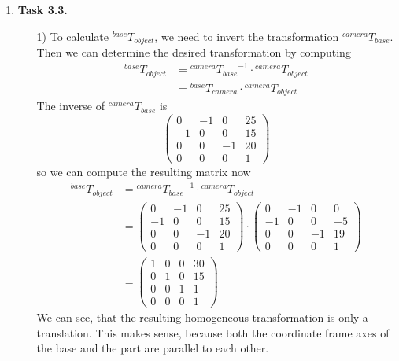 \documentclass[a4paper,11pt]{article}
\begin{document}
\begin {enumerate}
\item[\textbf{Task 3.3.}]

    \begin{enumerate}
        \item[1)] To calculate ${^{base}T_{object}}$, we need to invert the transformation ${^{camera}T_{base}}$. Then we can determine the desired transformation by computing
        \begin{align*}
          {^{base}T_{object}} &= {^{camera}T_{base}}^{-1} \cdot {^{camera}T_{object}}\\
          &= {^{base}T_{camera}} \cdot {^{camera}T_{object}}
        \end{align*}
        The inverse of ${^{camera}T_{base}}$ is
        $$\begin{pmatrix}
          0 & -1 & 0 & 25\\
          -1 & 0 & 0 & 15\\
          0 & 0 & -1 & 20\\
          0 & 0 & 0 & 1
        \end{pmatrix}$$
        so we can compute the resulting matrix now
        \begin{align*}
          {^{base}T_{object}} &= {^{camera}T_{base}}^{-1} \cdot {^{camera}T_{object}}\\
          &= \begin{pmatrix}
            0 & -1 & 0 & 25\\
            -1 & 0 & 0 & 15\\
            0 & 0 & -1 & 20\\
            0 & 0 & 0 & 1
          \end{pmatrix} \cdot
          \begin{pmatrix}
            0 & -1 & 0 & 0\\
            -1 & 0 & 0 & -5\\
            0 & 0 & -1 & 19\\
            0 & 0 & 0 & 1
          \end{pmatrix}\\
          &= \begin{pmatrix}
            1 & 0 & 0 & 30\\
            0 & 1 & 0 & 15\\
            0 & 0 & 1 & 1\\
            0 & 0 & 0 & 1
          \end{pmatrix}
        \end{align*}
        We can see, that the resulting homogeneous transformation is only a translation. This makes sense, because both the coordinate frame axes of the base and the part are parallel to each other.



\end{enumerate}
\end{enumerate}
\end{document}
